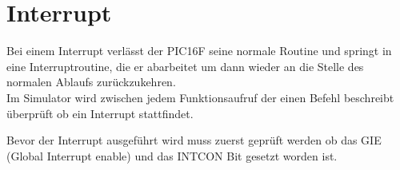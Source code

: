 \newpage
\section{Interrupt}

Bei einem Interrupt verlässt der PIC16F seine normale Routine und springt in eine Interruptroutine, die er abarbeitet um dann wieder an die Stelle des normalen Ablaufs zurückzukehren.
\\
\noindent Im Simulator wird zwischen jedem Funktionsaufruf der einen Befehl beschreibt überprüft ob ein Interrupt stattfindet.



\noindent Bevor der Interrupt ausgeführt wird muss zuerst geprüft werden ob das GIE (Global Interrupt enable) und das INTCON Bit gesetzt worden ist. 